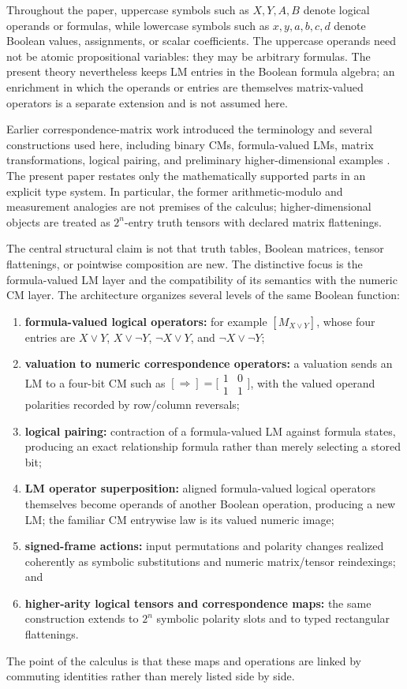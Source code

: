 \documentclass[11pt]{article}
\theoremstyle{definition}
\theoremstyle{remark}
\begin{document}
Throughout the paper, uppercase symbols such as $X,Y,A,B$ denote logical operands or formulas, while lowercase symbols such as $x,y,a,b,c,d$ denote Boolean values, assignments, or scalar coefficients.  The uppercase operands need not be atomic propositional variables: they may be arbitrary formulas.  The present theory nevertheless keeps LM entries in the Boolean formula algebra; an enrichment in which the operands or entries are themselves matrix-valued operators is a separate extension and is not assumed here.

Earlier correspondence-matrix work introduced the terminology and several constructions used here, including binary CMs, formula-valued LMs, matrix transformations, logical pairing, and preliminary higher-dimensional examples \cite{Droncheff2018}.  The present paper restates only the mathematically supported parts in an explicit type system.  In particular, the former arithmetic-modulo and measurement analogies are not premises of the calculus; higher-dimensional objects are treated as $2^n$-entry truth tensors with declared matrix flattenings.

The central structural claim is not that truth tables, Boolean matrices, tensor flattenings, or pointwise composition are new.  The distinctive focus is the formula-valued LM layer and the compatibility of its semantics with the numeric CM layer.  The architecture organizes several levels of the same Boolean function:
\begin{enumerate}
  \item \textbf{formula-valued logical operators:} for example $[M_{X\lor Y}]$, whose four entries are $X\lor Y$, $X\lor\neg Y$, $\neg X\lor Y$, and $\neg X\lor\neg Y$;
  \item \textbf{valuation to numeric correspondence operators:} a valuation sends an LM to a four-bit CM such as $[\Rightarrow]=\bigl[\begin{smallmatrix}1&0\\1&1\end{smallmatrix}\bigr]$, with the valued operand polarities recorded by row/column reversals;
  \item \textbf{logical pairing:} contraction of a formula-valued LM against formula states, producing an exact relationship formula rather than merely selecting a stored bit;
  \item \textbf{LM operator superposition:} aligned formula-valued logical operators themselves become operands of another Boolean operation, producing a new LM; the familiar CM entrywise law is its valued numeric image;
  \item \textbf{signed-frame actions:} input permutations and polarity changes realized coherently as symbolic substitutions and numeric matrix/tensor reindexings; and
  \item \textbf{higher-arity logical tensors and correspondence maps:} the same construction extends to $2^n$ symbolic polarity slots and to typed rectangular flattenings.
\end{enumerate}
The point of the calculus is that these maps and operations are linked by commuting identities rather than merely listed side by side.
\end{document}

